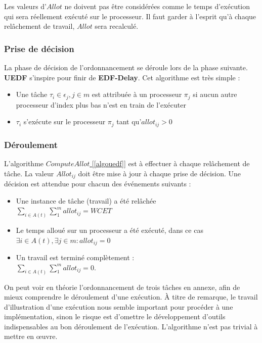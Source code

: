 	Les valeurs d'$Allot$ ne doivent pas être considérées comme le temps d'exécution qui sera réellement 
	exécuté sur le processeur. Il faut garder à l'esprit qu'à chaque relâchement de travail, 
	$Allot$ sera recalculé. 

	\subsubsection{Prise de décision}
	La phase de décision de l'ordonnancement se déroule lors de la phase suivante.
	\textbf{UEDF} s'inspire pour finir de \textbf{EDF-Delay}. 
	Cet algorithme est très simple :
	\begin{itemize}
		\setlength\itemsep{0.1em}
		\item Une tâche $\tau_i \in \epsilon_j, j \in m$ est attribuée à un processeur $\pi_j$ si aucun autre processeur d'index plus bas n'est en train de l'exécuter
		\item $\tau_i$ s'exécute sur le processeur $\pi_j$ tant qu'$allot_{ij} > 0$
	\end{itemize}


	\subsubsection{Déroulement}	
	L'algorithme \hyperref[algouedf]{$Compute Allot$ [\ref*{algouedf}]} est à effectuer à chaque relâchement de tâche. La valeur $Allot_{ij}$ 
	doit être mise à jour à chaque prise de décision. Une décision est attendue pour chacun des événements suivants :
	\begin{itemize}
		\setlength\itemsep{0.1em}
		\item Une instance de tâche (travail) a été relâchée\\
		 $\sum_{i \in A(t)}\sum_{1}^{m}allot_{ij} = WCET$
		\item Le temps alloué sur un processeur a été exécuté, dans ce cas\\ $\exists i \in A(t), \exists j \in m : allot_{ij} = 0$
		\item Un travail est terminé complètement : \\
		$\sum_{i \in A(t)}\sum_{1}^{m}allot_{ij} = 0$.
	\end{itemize}
	
	On peut voir en théorie l'ordonnancement de trois tâches en annexe, afin de mieux comprendre le déroulement d'une exécution.
	À titre de remarque, le travail d'illustration d'une exécution nous semble 
	important pour procéder à une implémentation, sinon le risque est d'omettre le développement 
	d'outils indispensables au bon déroulement de l'exécution. L'algorithme n'est pas trivial à mettre en œuvre.
	\newline
	
